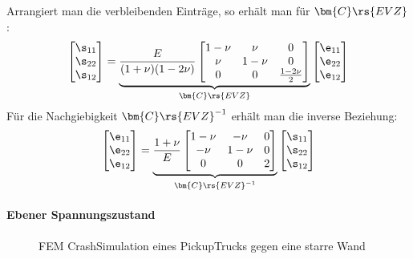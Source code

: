 \documentclass[letterpaper,10pt,german]{jupyterBook}
\let\sphinxpxdimen\pdfpxdimen\else\newdimen\sphinxpxdimen
\begin{document}
\sphinxAtStartPar
Arrangiert man die verbleibenden Einträge, so erhält man für \(\bm{C}\rs{EVZ}\):
\begin{equation}\label{equation:chapters/chapter1/elasticity:evz2}
\begin{split} \begin{bmatrix} 
\s_{11} \\
\s_{22} \\
\s_{12} 
\end{bmatrix}= \underbrace{\frac{E }{(1+\nu)(1-2\nu)} \begin{bmatrix}
1-\nu & \nu & 0 \\
\nu & 1-\nu & 0 \\
0 & 0 & \frac{1-2\nu}{2}
\end{bmatrix}}_{\bm{C}\rs{EVZ}}  \begin{bmatrix} 
\e_{11} \\
\e_{22} \\
\e_{12} 
\end{bmatrix}\end{split}
\end{equation}
\sphinxAtStartPar
Für die Nachgiebigkeit \(\bm{C}\rs{EVZ}^{-1}\) erhält man die inverse Beziehung:
\begin{equation}\label{equation:chapters/chapter1/elasticity:evz3}
\begin{split} \begin{bmatrix} 
\e_{11} \\
\e_{22} \\
\e_{12} 
\end{bmatrix}= \underbrace{\frac{1+\nu }{E} \begin{bmatrix}
1-\nu & -\nu & 0 \\
-\nu & 1-\nu & 0 \\
0 & 0 & 2
\end{bmatrix}}_{\bm{C}\rs{EVZ}^{-1}}  \begin{bmatrix} 
\s_{11} \\
\s_{22} \\
\s_{12} 
\end{bmatrix}\end{split}
\end{equation}



\paragraph{Ebener Spannungszustand}
\label{\detokenize{chapters/chapter1/elasticity:ebener-spannungszustand}}
\begin{figure}[htbp]
\centering
\capstart

\noindent\sphinxincludegraphics[height=500\sphinxpxdimen]{{CarCrash}.jpg}
\caption{FEM Crash\sphinxhyphen{}Simulation eines Pickup\sphinxhyphen{}Trucks gegen eine starre Wand }\label{\detokenize{chapters/chapter1/elasticity:carcrash}}\end{figure}
\end{document}
